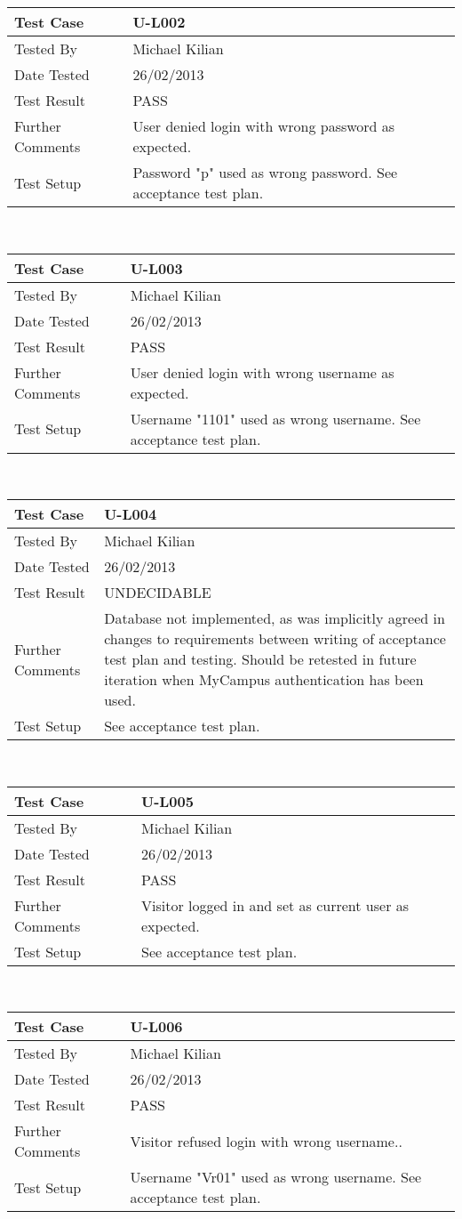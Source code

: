\documentclass{l3deliverable}
\begin{document}
\begin{tabular}{lp{10cm}}
\hline 
\textbf{Test Case} & U-L002\tabularnewline
\hline 
\hline 
Tested By & Michael Kilian\tabularnewline
\hline 
Date Tested & 26/02/2013\tabularnewline
\hline 
Test Result & PASS\tabularnewline
\hline
Further Comments & User denied login with wrong password as expected. \tabularnewline
\hline
Test Setup & Password "p" used as wrong password. See acceptance test plan. \tabularnewline
\hline
\end{tabular}\\

\begin{tabular}{lp{10cm}}
\hline 
\textbf{Test Case} & U-L003\tabularnewline
\hline 
\hline 
Tested By & Michael Kilian\tabularnewline
\hline 
Date Tested & 26/02/2013\tabularnewline
\hline 
Test Result & PASS\tabularnewline
\hline
Further Comments & User denied login with wrong username as expected. \tabularnewline
\hline
Test Setup & Username "1101" used as wrong username. See acceptance test plan. \tabularnewline
\hline
\end{tabular}\\

\begin{tabular}{lp{10cm}}
\hline 
\textbf{Test Case} & U-L004\tabularnewline
\hline 
\hline 
Tested By & Michael Kilian\tabularnewline
\hline 
Date Tested & 26/02/2013\tabularnewline
\hline 
Test Result & UNDECIDABLE\tabularnewline
\hline
Further Comments & Database not implemented, as was implicitly agreed in changes to requirements between writing of acceptance test plan and testing. Should be retested in future iteration when MyCampus authentication has been used. \tabularnewline
\hline
Test Setup & See acceptance test plan. \tabularnewline
\hline
\end{tabular}\\

\begin{tabular}{lp{10cm}}
\hline 
\textbf{Test Case} & U-L005\tabularnewline
\hline 
\hline 
Tested By & Michael Kilian\tabularnewline
\hline 
Date Tested & 26/02/2013\tabularnewline
\hline 
Test Result & PASS\tabularnewline
\hline
Further Comments & Visitor logged in and set as current user as expected. \tabularnewline
\hline
Test Setup & See acceptance test plan. \tabularnewline
\hline
\end{tabular}\\

\begin{tabular}{lp{10cm}}
\hline 
\textbf{Test Case} & U-L006\tabularnewline
\hline 
\hline 
Tested By & Michael Kilian\tabularnewline
\hline 
Date Tested & 26/02/2013\tabularnewline
\hline 
Test Result & PASS\tabularnewline
\hline
Further Comments &  Visitor refused login with wrong username.. \tabularnewline
\hline
Test Setup & Username "Vr01" used as wrong username. See acceptance test plan. \tabularnewline
\hline
\end{tabular}\\
\end{document}
